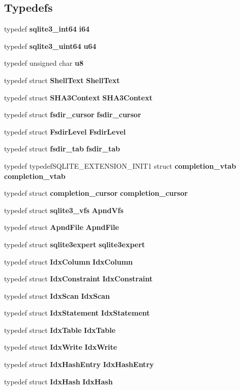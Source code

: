 \subsection*{Typedefs}
\begin{DoxyCompactItemize}
\item 
typedef \textbf{ sqlite3\+\_\+int64} \textbf{ i64}
\item 
typedef \textbf{ sqlite3\+\_\+uint64} \textbf{ u64}
\item 
typedef unsigned char \textbf{ u8}
\item 
typedef struct \textbf{ Shell\+Text} \textbf{ Shell\+Text}
\item 
typedef struct \textbf{ S\+H\+A3\+Context} \textbf{ S\+H\+A3\+Context}
\item 
typedef struct \textbf{ fsdir\+\_\+cursor} \textbf{ fsdir\+\_\+cursor}
\item 
typedef struct \textbf{ Fsdir\+Level} \textbf{ Fsdir\+Level}
\item 
typedef struct \textbf{ fsdir\+\_\+tab} \textbf{ fsdir\+\_\+tab}
\item 
typedef typedef\+S\+Q\+L\+I\+T\+E\+\_\+\+E\+X\+T\+E\+N\+S\+I\+O\+N\+\_\+\+I\+N\+I\+T1 struct \textbf{ completion\+\_\+vtab} \textbf{ completion\+\_\+vtab}
\item 
typedef struct \textbf{ completion\+\_\+cursor} \textbf{ completion\+\_\+cursor}
\item 
typedef struct \textbf{ sqlite3\+\_\+vfs} \textbf{ Apnd\+Vfs}
\item 
typedef struct \textbf{ Apnd\+File} \textbf{ Apnd\+File}
\item 
typedef struct \textbf{ sqlite3expert} \textbf{ sqlite3expert}
\item 
typedef struct \textbf{ Idx\+Column} \textbf{ Idx\+Column}
\item 
typedef struct \textbf{ Idx\+Constraint} \textbf{ Idx\+Constraint}
\item 
typedef struct \textbf{ Idx\+Scan} \textbf{ Idx\+Scan}
\item 
typedef struct \textbf{ Idx\+Statement} \textbf{ Idx\+Statement}
\item 
typedef struct \textbf{ Idx\+Table} \textbf{ Idx\+Table}
\item 
typedef struct \textbf{ Idx\+Write} \textbf{ Idx\+Write}
\item 
typedef struct \textbf{ Idx\+Hash\+Entry} \textbf{ Idx\+Hash\+Entry}
\item 
typedef struct \textbf{ Idx\+Hash} \textbf{ Idx\+Hash}

\end{DoxyCompactItemize}
